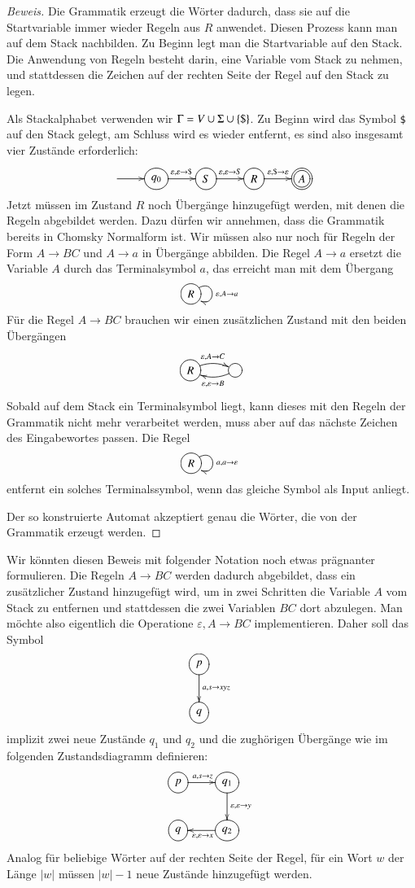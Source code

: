 \begin{proof}[Beweis]
Die Grammatik erzeugt die Wörter dadurch, dass sie auf die Startvariable
immer wieder Regeln aus $R$ anwendet. Diesen Prozess kann man auf dem
Stack nachbilden. Zu Beginn legt man die Startvariable auf den Stack.
Die Anwendung von Regeln besteht darin, eine Variable vom Stack zu nehmen,
und stattdessen die Zeichen auf der rechten Seite der Regel
auf den Stack zu legen. 

Als Stackalphabet verwenden wir $\Gamma = V\cup \Sigma \cup \{{\tt \$}\}$.
Zu Beginn wird das Symbol {\tt\$} auf den Stack gelegt, am Schluss wird 
es wieder entfernt, es sind also insgesamt vier Zustände erforderlich:
\[
\entrymodifiers={++[o][F]}
\xymatrix{
*+\txt{}\ar[r]
	&{q_0} \ar[r]^{\varepsilon,\varepsilon\to{\tt\$}}
		&{S}\ar[r]^{\varepsilon,\varepsilon\to S}
			&{R}\ar[r]^{\varepsilon,{\tt\$}\to\varepsilon}
				&*++[o][F=]{A}
}
\]
Jetzt müssen im Zustand $R$ noch Übergänge hinzugefügt werden, mit denen
die Regeln abgebildet werden.
Dazu dürfen wir annehmen, dass die Grammatik bereits in Chomsky Normalform
ist. Wir müssen also nur noch für Regeln der Form $A\to BC$ und $A\to a$
in Übergänge abbilden. Die Regel $A\to a$ ersetzt die Variable $A$
durch das Terminalsymbol $a$, das erreicht man mit dem Übergang
\[
\entrymodifiers={++[o][F]}
\xymatrix{
{R}\ar@(ur,dr)^{\varepsilon,A\to a}
}
\]
Für die Regel $A\to BC$ brauchen wir einen zusätzlichen Zustand mit
den beiden Übergängen
\[
\entrymodifiers={++[o][F]}
\xymatrix{
R\ar@/^/[r]^{\varepsilon,A\to C}
	&{}\ar@/^/[l]^{\varepsilon,\varepsilon\to B}
}
\]
Sobald auf dem Stack ein Terminalsymbol liegt, kann dieses mit
den Regeln der Grammatik nicht mehr verarbeitet werden, muss 
aber auf das nächste Zeichen des Eingabewortes passen. Die Regel
\[
\entrymodifiers={++[o][F]}
\xymatrix{
{R}\ar@(ur,dr)^{a,a\to\varepsilon}
}
\]
entfernt ein solches Terminalssymbol, wenn das gleiche Symbol
als Input anliegt.

Der so konstruierte Automat akzeptiert genau die
Wörter, die von der Grammatik erzeugt werden.
\end{proof}

Wir könnten diesen Beweis mit folgender Notation noch etwas
prägnanter formulieren. Die Regeln $A\to BC$ werden dadurch abgebildet,
dass ein zusätzlicher Zustand hinzugefügt wird, um in zwei Schritten
die Variable $A$ vom Stack zu entfernen und stattdessen die zwei Variablen
$BC$ dort abzulegen. Man möchte also eigentlich die Operatione
$\varepsilon,A\to BC$ implementieren. Daher soll das Symbol
\[
\entrymodifiers={++[o][F]}
\xymatrix{
{p}\ar[d]^{a,s\to xyz}
\\
{q}
}
\]
implizit zwei neue Zustände $q_1$ und $q_2$ und die zughörigen
Übergänge wie im folgenden Zustandsdiagramm definieren:
\[
\entrymodifiers={++[o][F]}
\xymatrix{
{p}\ar[r]^{a,s\to z}
	&{q_1}\ar[d]^{\varepsilon,\varepsilon\to y}
\\
{q}
	&{q_2}\ar[l]^{\varepsilon,\varepsilon\to x}
}
\]
Analog für beliebige Wörter auf der rechten Seite der Regel,
für ein Wort $w$ der Länge $|w|$ müssen $|w|-1$ neue
Zustände hinzugefügt werden.

